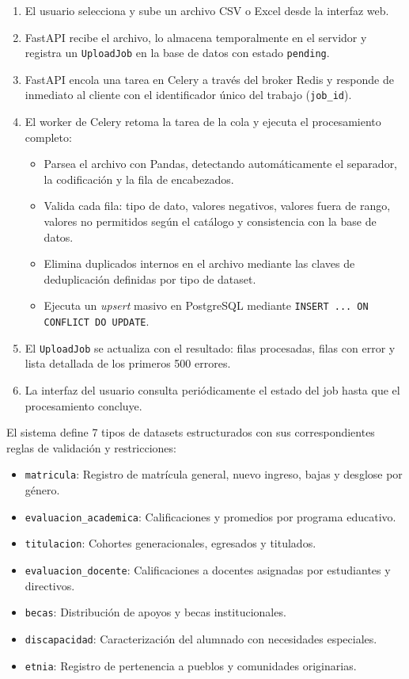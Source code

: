 \begin{enumerate}
    \item El usuario selecciona y sube un archivo CSV o Excel desde la interfaz web.
    \item FastAPI recibe el archivo, lo almacena temporalmente en el servidor y registra un \texttt{UploadJob} en la base de datos con estado \texttt{pending}.
    \item FastAPI encola una tarea en Celery a través del broker Redis y responde de inmediato al cliente con el identificador único del trabajo (\texttt{job\_id}).
    \item El worker de Celery retoma la tarea de la cola y ejecuta el procesamiento completo:
    \begin{itemize}
        \item Parsea el archivo con Pandas, detectando automáticamente el separador, la codificación y la fila de encabezados.
        \item Valida cada fila: tipo de dato, valores negativos, valores fuera de rango, valores no permitidos según el catálogo y consistencia con la base de datos.
        \item Elimina duplicados internos en el archivo mediante las claves de deduplicación definidas por tipo de dataset.
        \item Ejecuta un \textit{upsert} masivo en PostgreSQL mediante \texttt{INSERT ... ON CONFLICT DO UPDATE}.
    \end{itemize}
    \item El \texttt{UploadJob} se actualiza con el resultado: filas procesadas, filas con error y lista detallada de los primeros 500 errores.
    \item La interfaz del usuario consulta periódicamente el estado del job hasta que el procesamiento concluye.
\end{enumerate}

El sistema define 7 tipos de datasets estructurados con sus correspondientes reglas de validación y restricciones:
\begin{itemize}
    \item \texttt{matricula}: Registro de matrícula general, nuevo ingreso, bajas y desglose por género.
    \item \texttt{evaluacion\_academica}: Calificaciones y promedios por programa educativo.
    \item \texttt{titulacion}: Cohortes generacionales, egresados y titulados.
    \item \texttt{evaluacion\_docente}: Calificaciones a docentes asignadas por estudiantes y directivos.
    \item \texttt{becas}: Distribución de apoyos y becas institucionales.
    \item \texttt{discapacidad}: Caracterización del alumnado con necesidades especiales.
    \item \texttt{etnia}: Registro de pertenencia a pueblos y comunidades originarias.
\end{itemize}

